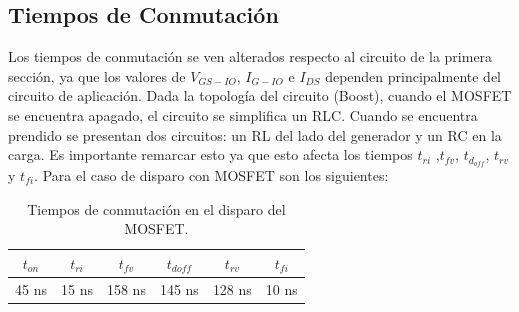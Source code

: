 \subsection{Tiempos de Conmutación}
Los tiempos de conmutación se ven alterados respecto al circuito de la primera sección, ya que los valores de $V_{GS-IO}$, $I_{G-IO}$ e $I_{DS}$ dependen principalmente del circuito de aplicación. Dada la topología del circuito (Boost), cuando el MOSFET se encuentra apagado, el circuito se simplifica un RLC. Cuando se encuentra prendido se presentan dos circuitos: un RL del lado del generador y un RC en la carga. Es importante remarcar esto ya que esto afecta los tiempos $t_{ri}$ ,$t_{fv}$, $t_{d_{off}}$, $t_{rv}$ y  $t_{fi}$. Para el caso de disparo con MOSFET son los siguientes:
\begin{table}[H]
\center
\begin{tabular}{cccccc}
\hline
$t_{on}$ & $t_{ri}$ & $t_{fv}$ & $t_{doff}$ & $t_{rv}$ & $t_{fi}$          \\	\hline
45 ns       & 15 ns       & 158 ns      & 145 ns        & 128 ns      & 10 ns     \\	 	\hline
\end{tabular}
\caption{Tiempos de conmutación en el disparo del MOSFET.}
\end{table}

